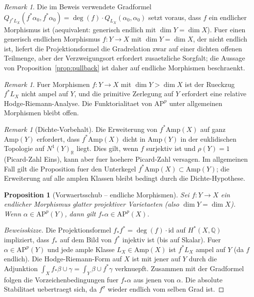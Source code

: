 \documentclass[aps,prd,twocolumn,superscriptaddress,nofootinbib]{revtex4-2}
\newtheorem{proposition}[theorem]{Proposition}
\theoremstyle{definition}
\theoremstyle{remark}
\newtheorem{remark}[theorem]{Remark}
\begin{document}
\begin{remark}
Die im Beweis verwendete Gradformel $Q_{f^*L_X}(f^*\alpha_0, f^*\alpha_0) = \deg(f) \cdot Q_{L_X}(\alpha_0, \alpha_0)$ setzt voraus, dass $f$ ein endlicher Morphismus ist (aequivalent: generisch endlich mit $\dim Y = \dim X$). Fuer einen generisch endlichen Morphismus $f: Y \to X$ mit $\dim Y = \dim X$, der nicht endlich ist, liefert die Projektionsformel die Gradrelation zwar auf einer dichten offenen Teilmenge, aber der Verzweigungsort erfordert zusaetzliche Sorgfalt; die Aussage von Proposition~\ref{prop:pullback} ist daher auf endliche Morphismen beschraenkt.
\end{remark}

\begin{remark}
Fuer Morphismen $f: Y \to X$ mit $\dim Y > \dim X$ ist der Rueckzug $f^*L_X$ nicht ampel auf $Y$, und die primitive Zerlegung auf $Y$ erfordert eine relative Hodge-Riemann-Analyse. Die Funktorialitaet von $\mathrm{AP}^p$ unter allgemeinen Morphismen bleibt offen.
\end{remark}

\begin{remark}[Dichte-Vorbehalt]\label{rem:density-caveat}
Die Erweiterung von $f^*\mathrm{Amp}(X)$ auf ganz $\mathrm{Amp}(Y)$ erfordert, dass $f^*\mathrm{Amp}(X)$ dicht in $\mathrm{Amp}(Y)$ in der euklidischen Topologie auf $N^1(Y)_{\mathbb{R}}$ liegt. Dies gilt, wenn $f$ surjektiv ist und $\rho(Y) = 1$ (Picard-Zahl Eins), kann aber fuer hoehere Picard-Zahl versagen. Im allgemeinen Fall gilt die Proposition fuer den Unterkegel $f^*\mathrm{Amp}(X) \subset \mathrm{Amp}(Y)$; die Erweiterung auf alle amplen Klassen bleibt bedingt durch die Dichte-Hypothese.
\end{remark}

\begin{proposition}[Vorwaertsschub -- endliche Morphismen]
\label{prop:pushforward}
Sei $f: Y \to X$ ein endlicher Morphismus glatter projektiver Varietaeten (also $\dim Y = \dim X$). Wenn $\alpha \in \mathrm{AP}^{p}(Y)$, dann gilt $f_*\alpha \in \mathrm{AP}^p(X)$.
\end{proposition}

\begin{proof}[Beweisskizze]
Die Projektionsformel $f_*f^* = \deg(f) \cdot \mathrm{id}$ auf $H^*(X, \mathbb{Q})$ impliziert, dass $f_*$ auf dem Bild von $f^*$ injektiv ist (bis auf Skalar). Fuer $\alpha \in \mathrm{AP}^p(Y)$ und jede ample Klasse $L_X \in \mathrm{Amp}(X)$ ist $f^*L_X$ ampel auf $Y$ (da $f$ endlich). Die Hodge-Riemann-Form auf $X$ ist mit jener auf $Y$ durch die Adjunktion $\int_X f_*\beta \cup \gamma = \int_Y \beta \cup f^*\gamma$ verknuepft. Zusammen mit der Gradformel folgen die Vorzeichenbedingungen fuer $f_*\alpha$ aus jenen von $\alpha$. Die absolute Stabilitaet uebertraegt sich, da $f^\sigma$ wieder endlich vom selben Grad ist.
\end{proof}
\end{document}
